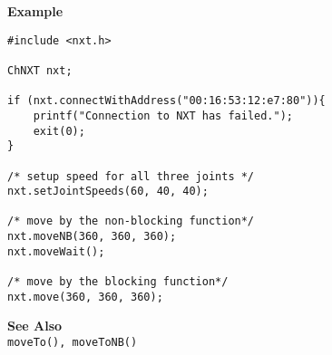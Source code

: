 \noindent
{\bf Example}
\begin{verbatim}
#include <nxt.h> 

ChNXT nxt;

if (nxt.connectWithAddress("00:16:53:12:e7:80")){
    printf("Connection to NXT has failed.");
    exit(0);
}
 
/* setup speed for all three joints */
nxt.setJointSpeeds(60, 40, 40);

/* move by the non-blocking function*/
nxt.moveNB(360, 360, 360);
nxt.moveWait();

/* move by the blocking function*/
nxt.move(360, 360, 360);
\end{verbatim}

\noindent
{\bf See Also}\\
{\tt moveTo(), moveToNB()}\\

